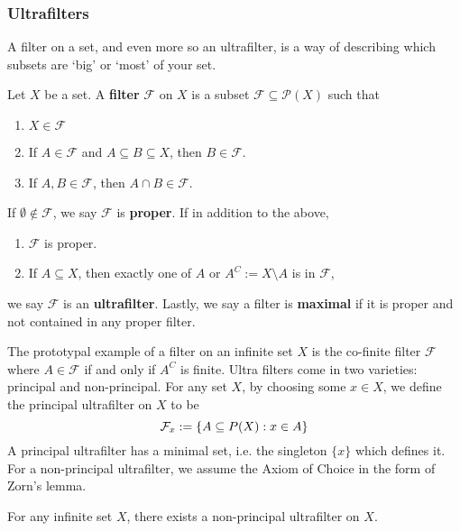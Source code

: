 \documentclass[draft]{amsart}
\newcommand{\F}{\mathcal{F}}
\newcommand{\Po}{\mathcal{P}}
\begin{document}
\subsubsection{Ultrafilters}
    A filter on a set, and even more so an ultrafilter, is a way of describing which subsets are `big' or `most' of your set.
    \begin{defn}
        Let \(X\) be a set. A \textbf{filter} \(\F\) on \(X\) is a subset \(\F\subseteq \Po(X) \) such that
        \begin{enumerate}[label=(\roman*)]
            \item \(X\in \F\) 
            \item If \(A\in \F\) and \(A\subseteq B \subseteq X\), then \(B\in \F\).
            \item If \(A,B\in \F\), then \(A\cap B\in \F\).
        \end{enumerate}
        If \(\emptyset \notin \F\), we say \(\F\) is \textbf{proper}. If in addition to the above,
        \begin{enumerate}[label=(\roman*), resume]
            \item \(\F\) is proper.
            \item If \(A\subseteq X\), then exactly one of \(A\) or \(A^C:=X\setminus A\) is in \(\F\),
        \end{enumerate}
        we say \(\F\) is an \textbf{ultrafilter}.
        Lastly, we say a filter is \textbf{maximal} if it is proper and not contained in any proper filter.
    \end{defn}
    The prototypal example of a filter on an infinite set \(X\) is the co-finite filter \(\F\) where \(A\in \F\) if and only if \(A^C\) is finite. Ultra filters come in two varieties: principal and non-principal. For any set \(X\), by choosing some \(x\in X\), we define the principal ultrafilter on \(X\) to be
    \[\F_x:=\set{A\subseteq P(X)}{x\in A}\]
    A principal ultrafilter has a minimal set, i.e. the singleton \(\{x\}\) which defines it. For a non-principal ultrafilter, we assume the Axiom of Choice in the form of Zorn's lemma.
    \begin{prop}
        For any infinite set \(X\), there exists a non-principal ultrafilter on \(X\).
    \end{prop}
\end{document}
